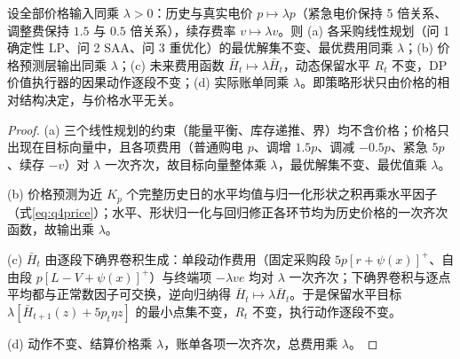 \begin{proposition}[价格同比缩放不变性]\label{prop:scale}
设全部价格输入同乘 $\lambda>0$：历史与真实电价 $p\mapsto\lambda p$（紧急电价保持 5 倍关系、调整费保持 $1.5$ 与 $0.5$ 倍关系），续存费率 $v\mapsto\lambda v$。则 (a) 各采购线性规划（问 1 确定性 LP、问 2 SAA、问 3 重优化）的最优解集不变、最优费用同乘 $\lambda$；(b) 价格预测层输出同乘 $\lambda$；(c) 未来费用函数 $\bar H_t\mapsto\lambda\bar H_t$，动态保留水平 $R_t$ 不变，DP 价值执行器的因果动作逐段不变；(d) 实际账单同乘 $\lambda$。即策略形状只由价格的相对结构决定，与价格水平无关。
\end{proposition}

\begin{proof}
(a) 三个线性规划的约束（能量平衡、库存递推、界）均不含价格；价格只出现在目标向量中，且各项费用（普通购电 $p$、调增 $1.5p$、调减 $-0.5p$、紧急 $5p$、续存 $-v$）对 $\lambda$ 一次齐次，故目标向量整体乘 $\lambda$，最优解集不变、最优值乘 $\lambda$。

(b) 价格预测为近 $K_p$ 个完整历史日的水平均值与归一化形状之积再乘水平因子（式\eqref{eq:q4price}）；水平、形状归一化与回归修正各环节均为历史价格的一次齐次函数，故输出乘 $\lambda$。

(c) $\bar H_t$ 由逐段下确界卷积生成：单段动作费用（固定采购段 $5p[r+\psi(x)]^+$、自由段 $p[L-V+\psi(x)]^+$）与终端项 $-\lambda ve$ 均对 $\lambda$ 一次齐次；下确界卷积与逐点平均都与正常数因子可交换，逆向归纳得 $\bar H_t\mapsto\lambda\bar H_t$。于是保留水平目标 $\lambda[\bar H_{t+1}(z)+5p_t\eta z]$ 的最小点集不变，$R_t$ 不变，执行动作逐段不变。

(d) 动作不变、结算价格乘 $\lambda$，账单各项一次齐次，总费用乘 $\lambda$。
\end{proof}
